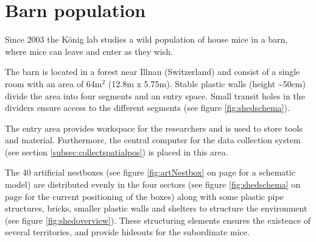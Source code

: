 \newpage
\section{Barn population}
\label{sec:shedsetup}

Since 2003 the K\"onig lab studies a wild population of house mice in a barn, where mice can leave and enter as they wish.

The barn is located in a forest near Illnau (Switzerland) and consist of a single room with an area of 64m$^2$ (12.8m x 5.75m). Stable plastic walls (height \textasciitilde50cm) divide the area into four segments and an entry space. Small transit holes in the dividers ensure access to the different segments (see figure \ref{fig:shedschema}).

The entry area provides workspace for the researchers and is used to store tools and material. Furthermore, the central computer for the data collection system (see section \ref{subsec:collectspatialpos}) is placed in this area.

The 40 artificial nestboxes (see figure \ref{fig:artNestbox} on page \pageref{fig:artNestbox} for a schematic model) are distributed evenly in the four sectors (see figure \ref{fig:shedschema} on page \pageref{fig:shedschema} for the current positioning of the boxes) along with some plastic pipe structures, bricks, smaller plastic walls and shelters to structure the environment (see figure \ref{fig:shedoverview}). These structuring elements ensures the existence of several territories, and provide hideouts for the subordinate mice.

